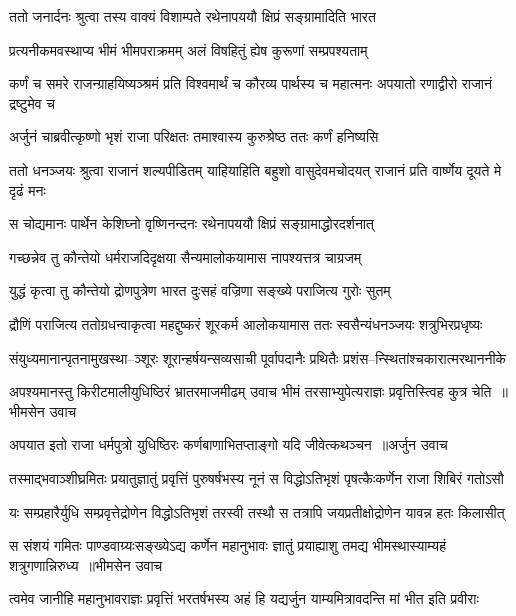 \twolineshloka
{ततो जनार्दनः श्रुत्वा तस्य वाक्यं विशाम्पते}
{रथेनापययौ क्षिप्रं सङ्ग्रामादिति भारत}


\twolineshloka
{प्रत्यनीकमवस्थाप्य भीमं भीमपराक्रमम्}
{अलं विषहितुं ह्येष कुरूणां सम्प्रपश्यताम्}


\threelineshloka
{कर्णं च समरे राजन्ग्राहयिष्यञ्श्रमं प्रति}
{विश्वमार्थं च कौरव्य पार्थस्य च महात्मनः}
{अपयातो रणाद्वीरो राजानं द्रष्टुमेव च}


\twolineshloka
{अर्जुनं चाब्रवीत्कृष्णो भृशं राजा परिक्षतः}
{तमाश्वास्य कुरुश्रेष्ठ ततः कर्णं हनिष्यसि}


\threelineshloka
{ततो धनञ्जयः श्रुत्वा राजानं शल्यपीडितम्}
{याहियाहिति बहुशो वासुदेवमचोदयत्}
{राजानं प्रति वार्ष्णेय दूयते मे दृढं मनः}


\twolineshloka
{स चोद्यमानः पार्थेन केशिघ्नो वृष्णिनन्दनः}
{रथेनापययौ क्षिप्रं सङ्ग्रामाद्धोरदर्शनात्}


\twolineshloka
{गच्छन्नेव तु कौन्तेयो धर्मराजदिदृक्षया}
{सैन्यमालोकयामास नापश्यत्तत्र चाग्रजम्}


\twolineshloka
{युद्धं कृत्वा तु कौन्तेयो द्रोणपुत्रेण भारत}
{दुःसहं वज्रिणा सङ्ख्ये पराजित्य गुरोः सुतम्}


\twolineshloka
{द्रौणिं पराजित्य ततोग्रधन्वाकृत्वा महद्दुष्करं शूरकर्म}
{आलोकयामास ततः स्वसैन्यंधनञ्जयः शत्रुभिरप्रधृष्यः}


\twolineshloka
{संयुध्यमानान्पृतनामुखस्था--ञ्शूरः शूरान्हर्षयन्सव्यसाची}
{पूर्वापदानैः प्रथितैः प्रशंस--न्स्थितांश्चकारात्मरथाननीके}


\threelineshloka
{अपश्यमानस्तु किरीटमालीयुधिष्ठिरं भ्रातरमाजमीढम्}
{उवाच भीमं तरसाभ्युपेत्यराज्ञः प्रवृत्तिस्त्विह कुत्र चेति ॥भीमसेन उवाच}
{}


\threelineshloka
{अपयात इतो राजा धर्मपुत्रो युधिष्ठिरः}
{कर्णबाणाभितप्ताङ्गो यदि जीवेत्कथञ्चन ॥अर्जुन उवाच}
{}


\twolineshloka
{तस्माद्भवाञ्शीघ्रमितः प्रयातुज्ञातुं प्रवृत्तिं पुरुषर्षभस्य}
{नूनं स विद्धोऽतिभृशं पृषत्कैःकर्णेन राजा शिबिरं गतोऽसौ}


\twolineshloka
{यः सम्प्रहारैर्युधि सम्प्रवृत्तेद्रोणेन विद्धोऽतिभृशं तरस्वी}
{तस्थौ स तत्रापि जयप्रतीक्षोद्रोणेन यावन्न हतः किलासीत्}


\threelineshloka
{स संशयं गमितः पाण्डवाग्र्यःसङ्ख्येऽद्य कर्णेन महानुभावः}
{ज्ञातुं प्रयाह्याशु तमद्य भीमस्थास्याम्यहं शत्रुगणान्निरुध्य ॥भीमसेन उवाच}
{}


\twolineshloka
{त्वमेव जानीहि महानुभावराज्ञः प्रवृत्तिं भरतर्षभस्य}
{अहं हि यद्यर्जुन याम्यमित्रावदन्ति मां भीत इति प्रवीराः}


